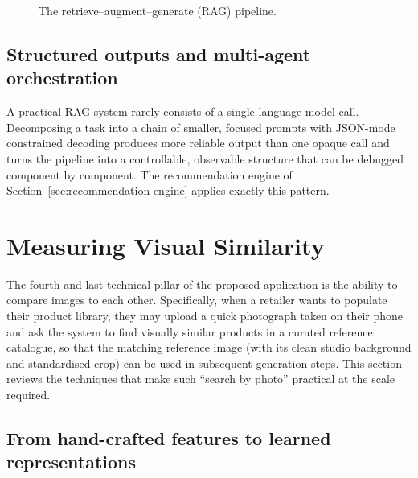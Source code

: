 \begin{figure}[ht]
{}
\caption{The retrieve--augment--generate (RAG) pipeline.}
\label{fig:rag}
\end{figure}

\subsection{Structured outputs and multi-agent orchestration}

A practical RAG system rarely consists of a single language-model call. Decomposing a task into a chain of smaller, focused prompts with JSON-mode constrained decoding produces more reliable output than one opaque call and turns the pipeline into a controllable, observable structure that can be debugged component by component. The recommendation engine of Section~\ref{sec:recommendation-engine} applies exactly this pattern.

\section{Measuring Visual Similarity}
\label{sec:visual-similarity}

The fourth and last technical pillar of the proposed application is the ability to compare images to each other. Specifically, when a retailer wants to populate their product library, they may upload a quick photograph taken on their phone and ask the system to find visually similar products in a curated reference catalogue, so that the matching reference image (with its clean studio background and standardised crop) can be used in subsequent generation steps. This section reviews the techniques that make such ``search by photo'' practical at the scale required.

\subsection{From hand-crafted features to learned representations}


